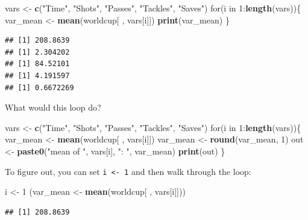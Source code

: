 \documentclass[]{book}
\makeatletter
\newenvironment{Shaded}{\begin{snugshade}}{\end{snugshade}}
\newcommand{\KeywordTok}[1]{\textcolor[rgb]{0.13,0.29,0.53}{\textbf{{#1}}}}
\newcommand{\DecValTok}[1]{\textcolor[rgb]{0.00,0.00,0.81}{{#1}}}
\newcommand{\StringTok}[1]{\textcolor[rgb]{0.31,0.60,0.02}{{#1}}}
\newcommand{\NormalTok}[1]{{#1}}
\newenvironment{kframe}{%
\medskip{}
\setlength{\fboxsep}{.8em}
 \def\at@end@of@kframe{}%
 \ifinner\ifhmode%
  \def\at@end@of@kframe{\end{minipage}}%
  \begin{minipage}{\columnwidth}%
 \fi\fi%
 \def\FrameCommand##1{\hskip\@totalleftmargin \hskip-\fboxsep
 \colorbox{shadecolor}{##1}\hskip-\fboxsep
     \hskip-\linewidth \hskip-\@totalleftmargin \hskip\columnwidth}%
 \MakeFramed {\advance\hsize-\width
   \@totalleftmargin\z@ \linewidth\hsize
   \@setminipage}}%
 {\par\unskip\endMakeFramed%
 \at@end@of@kframe}
\renewenvironment{Shaded}{\begin{kframe}}{\end{kframe}}
\makeatother
\begin{document}
\begin{Shaded}
\begin{Highlighting}[]
\NormalTok{vars <-}\StringTok{ }\KeywordTok{c}\NormalTok{(}\StringTok{"Time"}\NormalTok{, }\StringTok{"Shots"}\NormalTok{, }\StringTok{"Passes"}\NormalTok{, }\StringTok{"Tackles"}\NormalTok{, }\StringTok{"Saves"}\NormalTok{)}
\NormalTok{for(i in }\DecValTok{1}\NormalTok{:}\KeywordTok{length}\NormalTok{(vars))\{}
        \NormalTok{var_mean <-}\StringTok{ }\KeywordTok{mean}\NormalTok{(worldcup[ , vars[i]])}
        \KeywordTok{print}\NormalTok{(var_mean)}
\NormalTok{\}}
\end{Highlighting}
\end{Shaded}

\begin{verbatim}
## [1] 208.8639
## [1] 2.304202
## [1] 84.52101
## [1] 4.191597
## [1] 0.6672269
\end{verbatim}

What would this loop do?

\begin{Shaded}
\begin{Highlighting}[]
\NormalTok{vars <-}\StringTok{ }\KeywordTok{c}\NormalTok{(}\StringTok{"Time"}\NormalTok{, }\StringTok{"Shots"}\NormalTok{, }\StringTok{"Passes"}\NormalTok{, }\StringTok{"Tackles"}\NormalTok{, }\StringTok{"Saves"}\NormalTok{)}
\NormalTok{for(i in }\DecValTok{1}\NormalTok{:}\KeywordTok{length}\NormalTok{(vars))\{}
        \NormalTok{var_mean <-}\StringTok{ }\KeywordTok{mean}\NormalTok{(worldcup[ , vars[i]])}
        \NormalTok{var_mean <-}\StringTok{ }\KeywordTok{round}\NormalTok{(var_mean, }\DecValTok{1}\NormalTok{)}
        \NormalTok{out <-}\StringTok{ }\KeywordTok{paste0}\NormalTok{(}\StringTok{"mean of "}\NormalTok{, vars[i], }\StringTok{": "}\NormalTok{, var_mean)}
        \KeywordTok{print}\NormalTok{(out)}
\NormalTok{\}}
\end{Highlighting}
\end{Shaded}

To figure out, you can set \texttt{i\ \textless{}-\ 1} and then walk
through the loop:

\begin{Shaded}
\begin{Highlighting}[]
\NormalTok{i <-}\StringTok{ }\DecValTok{1}
\NormalTok{(var_mean <-}\StringTok{ }\KeywordTok{mean}\NormalTok{(worldcup[ , vars[i]]))}
\end{Highlighting}
\end{Shaded}

\begin{verbatim}
## [1] 208.8639
\end{verbatim}
\end{document}

